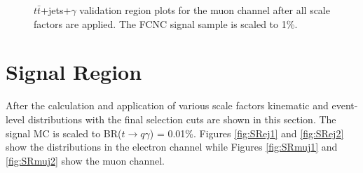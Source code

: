 \begin{figure}[h!]
\hfil  %
\caption{$t\bar{t}$+jets+$\gamma$ validation region plots for the muon channel after all scale factors are applied.  The FCNC signal sample is scaled to 1\%.} %
\label{fig:VR2muj}
\end{figure}



\section{Signal Region}
\label{sec:SRPlots}
After the calculation and application of various scale factors kinematic and event-level distributions with the final selection cuts are shown in this section.  The signal MC is scaled to BR($t\rightarrow q\gamma$) = 0.01\%.  Figures \ref{fig:SRej1} and \ref{fig:SRej2} show the distributions in the electron channel while Figures \ref{fig:SRmuj1} and \ref{fig:SRmuj2} show the muon channel.  %

